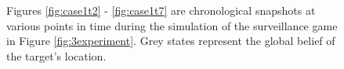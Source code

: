 \begin{figure}
\begin{minipage}{5.0cm}
{		}
		
	\end{minipage}
	
	
	\caption{Figures \ref{fig:case1t2} - \ref{fig:case1t7} are chronological snapshots at various points in time during the simulation of the surveillance game in Figure \ref{fig:3experiment}. Grey states represent the global belief of the target's location.  
	}\vspace{-0.5cm}
	\label{fig:case1exp}
	
\end{figure}

